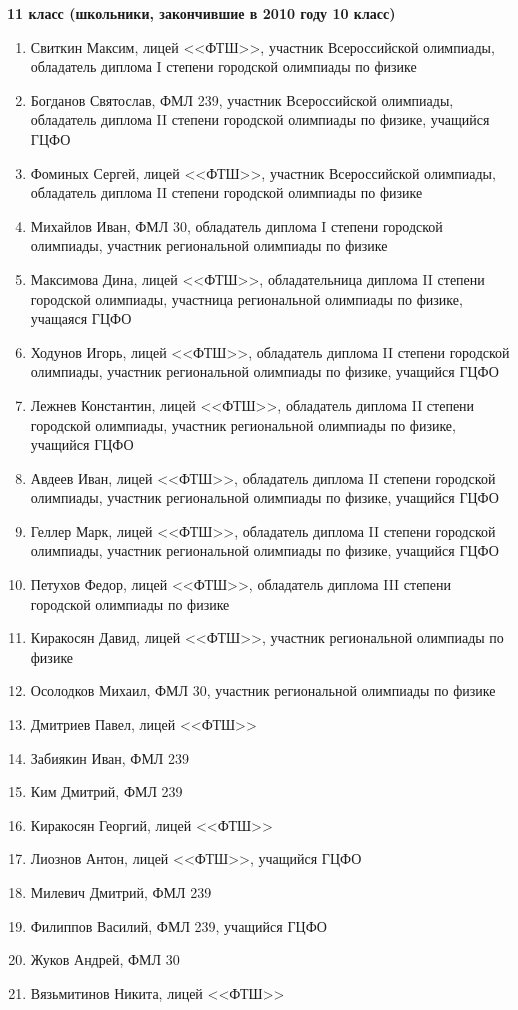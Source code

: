 \textbf{11 класс (школьники, закончившие в 2010 году 10 класс)}
\begin{enumerate}
\item Свиткин Максим, лицей <<ФТШ>>, участник Всероссийской олимпиады,
  обладатель диплома I степени городской олимпиады по физике
\item Богданов Святослав, ФМЛ 239, участник Всероссийской олимпиады,
  обладатель диплома II степени городской олимпиады по физике,
  учащийся ГЦФО
\item Фоминых Сергей, лицей <<ФТШ>>, участник Всероссийской олимпиады,
  обладатель диплома II степени городской олимпиады по физике
\item Михайлов Иван, ФМЛ 30, обладатель диплома I степени городской
  олимпиады, участник региональной олимпиады по физике
\item Максимова Дина, лицей <<ФТШ>>, обладательница диплома II степени
  городской олимпиады, участница региональной олимпиады по физике,
  учащаяся ГЦФО
\item Ходунов Игорь, лицей <<ФТШ>>, обладатель диплома II степени
  городской олимпиады, участник региональной олимпиады по физике,
  учащийся ГЦФО
\item Лежнев Константин, лицей <<ФТШ>>, обладатель диплома II степени
  городской олимпиады, участник региональной олимпиады по физике,
  учащийся ГЦФО
\item Авдеев Иван, лицей <<ФТШ>>, обладатель диплома II степени
  городской олимпиады, участник региональной олимпиады по физике,
  учащийся ГЦФО
\item Геллер Марк, лицей <<ФТШ>>, обладатель диплома II степени
  городской олимпиады, участник региональной олимпиады по физике,
  учащийся ГЦФО
\item Петухов Федор, лицей <<ФТШ>>, обладатель диплома III степени
  городской олимпиады по физике
\item Киракосян Давид, лицей <<ФТШ>>, участник региональной олимпиады по физике
\item Осолодков Михаил, ФМЛ 30, участник региональной олимпиады по физике
\item Дмитриев Павел, лицей <<ФТШ>>
\item Забиякин Иван, ФМЛ 239	
\item Ким Дмитрий, ФМЛ 239
\item Киракосян Георгий, лицей <<ФТШ>>
\item Лиознов Антон, лицей <<ФТШ>>, учащийся ГЦФО
\item Милевич Дмитрий, ФМЛ 239
\item Филиппов Василий, ФМЛ 239, учащийся ГЦФО
\item Жуков Андрей, ФМЛ 30
\item Вязьмитинов Никита, лицей <<ФТШ>>
\end{enumerate}
